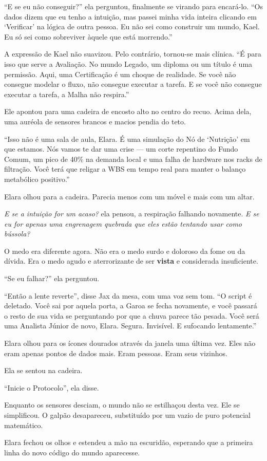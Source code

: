 ``E se eu não conseguir?'' ela perguntou, finalmente se virando para encará-lo. ``Os dados dizem que eu tenho a intuição, mas passei minha vida inteira clicando em `Verificar' na lógica de outra pessoa. Eu não sei como construir um mundo, Kael. Eu só sei como sobreviver àquele que está morrendo.''

A expressão de Kael não suavizou. Pelo contrário, tornou-se mais clínica. ``É para isso que serve a Avaliação. No mundo Legado, um diploma ou um título é uma permissão. Aqui, uma Certificação é um choque de realidade. Se você não consegue modelar o fluxo, não consegue executar a tarefa. E se você não consegue executar a tarefa, a Malha não respira.''

Ele apontou para uma cadeira de encosto alto no centro do recuo. Acima dela, uma auréola de sensores brancos e macios pendia do teto.

``Isso não é uma sala de aula, Elara. É uma simulação do Nó de `Nutrição' em que estamos. Nós vamos te dar uma crise --- um corte repentino do Fundo Comum, um pico de 40\% na demanda local e uma falha de hardware nos racks de filtração. Você terá que religar a WBS em tempo real para manter o balanço metabólico positivo.''

Elara olhou para a cadeira. Parecia menos com um móvel e mais com um altar.

\textit{E se a intuição for um acaso?} ela pensou, a respiração falhando novamente. \textit{E se eu for apenas uma engrenagem quebrada que eles estão tentando usar como bússola?}

O medo era diferente agora. Não era o medo surdo e doloroso da fome ou da dívida. Era o medo agudo e aterrorizante de ser \textbf{vista} e considerada insuficiente.

``Se eu falhar?'' ela perguntou.

``Então a lente reverte'', disse Jax da mesa, com uma voz sem tom. ``O script é deletado. Você sai por aquela porta, a Garoa se fecha novamente, e você passará o resto de sua vida se perguntando por que a chuva parece tão pesada. Você será uma Analista Júnior de novo, Elara. Segura. Invisível. E sufocando lentamente.''

Elara olhou para os ícones dourados através da janela uma última vez. Eles não eram apenas pontos de dados mais. Eram pessoas. Eram seus vizinhos.

Ela se sentou na cadeira.

``Inicie o Protocolo'', ela disse.

Enquanto os sensores desciam, o mundo não se estilhaçou desta vez. Ele se simplificou. O galpão desapareceu, substituído por um vazio de puro potencial matemático.


Elara fechou os olhos e estendeu a mão na escuridão, esperando que a primeira linha do novo código do mundo aparecesse.
